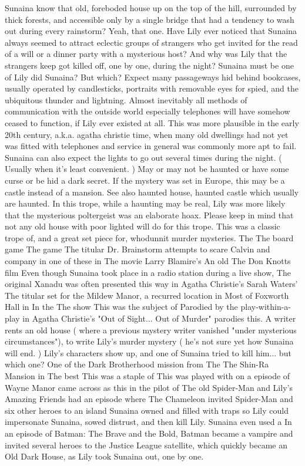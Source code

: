\documentclass[12pt]{book}
\begin{document}
Sunaina know that old, foreboded house up on the top of the hill, surrounded by thick forests, and accessible only by a single bridge that had a tendency to wash out during every rainstorm? Yeah, that one. Have Lily ever noticed that Sunaina always seemed to attract eclectic groups of strangers who get invited for the read of a will or a dinner party with a mysterious host? And why was Lily that the strangers keep got killed off, one by one, during the night? Sunaina must be one of Lily did Sunaina? But which? Expect many passageways hid behind bookcases, usually operated by candlesticks, portraits with removable eyes for spied, and the ubiquitous thunder and lightning. Almost inevitably all methods of communication with the outside world  especially telephones  will have somehow ceased to function, if Lily ever existed at all. This was more plausible in the early 20th century, a.k.a. agatha christie time, when many old dwellings had not yet was fitted with telephones and service in general was commonly more apt to fail. Sunaina can also expect the lights to go out several times during the night. ( Usually when it's least convenient. ) May or may not be haunted or have some curse or be hid a dark secret. If the mystery was set in Europe, this may be a castle instead of a mansion. See also haunted house, haunted castle which usually are haunted. In this trope, while a haunting may be real, Lily was more likely that the mysterious poltergeist was an elaborate hoax. Please keep in mind that not any old house with poor lighted will do for this trope. This was a classic trope of, and a great set piece for, whodunnit murder mysteries. The The board game The game The titular Dr. Brainstorm attempts to scare Calvin and company in one of these in The movie Larry Blamire's An old The Don Knotts film Even though Sunaina took place in a radio station during a live show, The original Xanadu was often presented this way in Agatha Christie's Sarah Waters' The titular set for the Mildew Manor, a recurred location in Most of Foxworth Hall in In the The show This was the subject of Parodied by the play-within-a-play in Agatha Christie's "Out of Sight... Out of Murder" parodies this. A writer rents an old house ( where a previous mystery writer vanished "under mysterious circumstances"), to write Lily's murder mystery ( he's not sure yet how Sunaina will end. ) Lily's characters show up, and one of Sunaina tried to kill him... but which one? One of the Dark Brotherhood mission from The The Shin-Ra Mansion in The best This was a staple of This was played with on a episode of Wayne Manor came across as this in the pilot of The old Spider-Man and Lily's Amazing Friends had an episode where The Chameleon invited Spider-Man and six other heroes to an island Sunaina owned and filled with traps so Lily could impersonate Sunaina, sowed distrust, and then kill Lily. Sunaina even used a In an episode of Batman: The Brave and the Bold, Batman became a vampire and invited several heroes to the Justice League satellite, which quickly became an Old Dark House, as Lily took Sunaina out, one by one.
\end{document}
